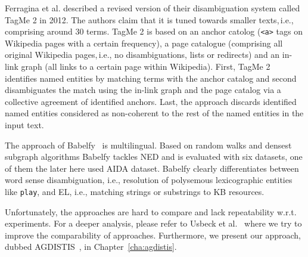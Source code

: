 Ferragina et al. described a revised version of their disambiguation system called TagMe 2 in 2012.
The authors claim that it is tuned towards smaller texts,\,i.e., comprising around 30 terms.
TagMe 2 is based on an anchor catolog (\texttt{<a>} tags on Wikipedia pages with a certain frequency), a page catalogue (comprising all original Wikipedia pages,\,i.e., no disambiguations, lists or redirects) and an in-link graph (all links to a certain page within Wikipedia).
First, TagMe 2 identifies named entities by matching terms with the anchor catalog and second disambiguates the match using the in-link graph and the page catalog via a collective agreement of identified anchors. 
Last, the approach discards identified named entities considered as non-coherent to the rest of the named entities in the input text.  

The approach of Babelfy~\cite{babelfy} is multilingual.
Based on random walks and densest subgraph algorithms Babelfy tackles \ac{NED} and is evaluated with six datasets, one of them the later here used AIDA dataset. 
Babelfy clearly differentiates between word sense disambiguation, i.e., resolution of polysemous lexicographic entities like \texttt{play}, and \ac{EL}, i.e., matching strings or substrings to \ac{KB} resources.

Unfortunately, the approaches are hard to compare and lack repeatability w.r.t. experiments.
For a deeper analysis, please refer to Usbeck et al.~\cite{GERBIL} where we try to improve the comparability of approaches.
Furthermore, we present our approach, dubbed AGDISTIS~\cite{agdistis_iswc}, in Chapter~\ref{cha:agdistis}. 



